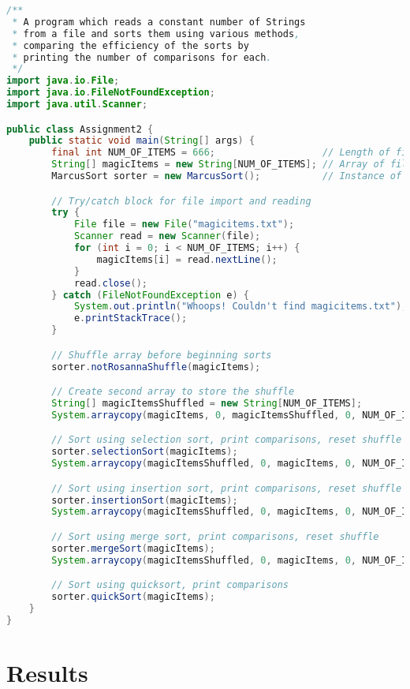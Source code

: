 \documentclass[letterpaper, 10pt]{article}
\begin{document}
\begin{lstlisting}[language=Java]
/**
 * A program which reads a constant number of Strings
 * from a file and sorts them using various methods,
 * comparing the efficiency of the sorts by
 * printing the number of comparisons for each.
 */
import java.io.File;
import java.io.FileNotFoundException;
import java.util.Scanner;

public class Assignment2 {
    public static void main(String[] args) {
        final int NUM_OF_ITEMS = 666;                   // Length of file as constant
        String[] magicItems = new String[NUM_OF_ITEMS]; // Array of file strings
        MarcusSort sorter = new MarcusSort();           // Instance of MarcusSort

        // Try/catch block for file import and reading
        try {
            File file = new File("magicitems.txt");
            Scanner read = new Scanner(file);
            for (int i = 0; i < NUM_OF_ITEMS; i++) {
                magicItems[i] = read.nextLine();
            }
            read.close();
        } catch (FileNotFoundException e) {
            System.out.println("Whoops! Couldn't find magicitems.txt");
            e.printStackTrace();
        }

        // Shuffle array before beginning sorts
        sorter.notRosannaShuffle(magicItems);

        // Create second array to store the shuffle
        String[] magicItemsShuffled = new String[NUM_OF_ITEMS];
        System.arraycopy(magicItems, 0, magicItemsShuffled, 0, NUM_OF_ITEMS);

        // Sort using selection sort, print comparisons, reset shuffle
        sorter.selectionSort(magicItems);
        System.arraycopy(magicItemsShuffled, 0, magicItems, 0, NUM_OF_ITEMS);

        // Sort using insertion sort, print comparisons, reset shuffle
        sorter.insertionSort(magicItems);
        System.arraycopy(magicItemsShuffled, 0, magicItems, 0, NUM_OF_ITEMS);

        // Sort using merge sort, print comparisons, reset shuffle
        sorter.mergeSort(magicItems);
        System.arraycopy(magicItemsShuffled, 0, magicItems, 0, NUM_OF_ITEMS);

        // Sort using quicksort, print comparisons
        sorter.quickSort(magicItems);
    }
}
\end{lstlisting}

\section{Results}
\end{document}
